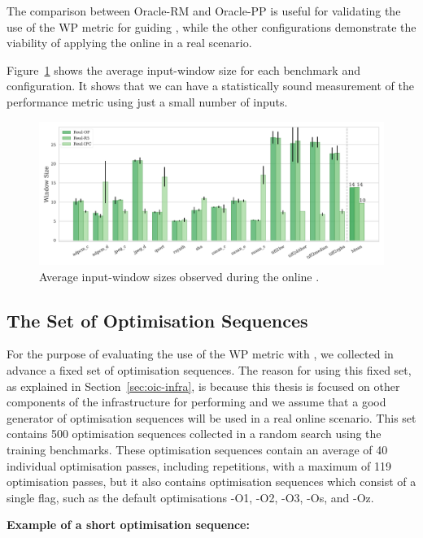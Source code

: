 The comparison between Oracle-RM and Oracle-PP is useful for validating the use of the WP metric for guiding {\itercomp}, while the other configurations demonstrate the viability of applying the online {\itercomp} in a real scenario.

Figure~\ref{fig:window-size} shows the average input-window size for each benchmark and configuration.
It shows that we can have a statistically sound measurement of the performance metric using just a small number of inputs.

\begin{figure}[htb]
    \centering
    \includegraphics[width=\textwidth]{figs/window-size.pdf}
    \caption{Average input-window sizes observed during the online {\itercomp}.}
    \label{fig:window-size}
\end{figure}
\newpage
\subsection{The Set of Optimisation Sequences}

For the purpose of evaluating the use of the WP metric with {\itercomp}, we collected in advance a fixed set of optimisation sequences.
The reason for using this fixed set, as explained in Section~\ref{sec:oic-infra}, is because this thesis is focused on other components of the infrastructure for performing {\itercomp} and we assume that a good generator of optimisation sequences will be used in a real online scenario.
This set contains 500 optimisation sequences collected in a random search using the training benchmarks.
These optimisation sequences contain an average of 40 individual optimisation passes, including repetitions, with a maximum of 119 optimisation passes, but it also contains optimisation sequences which consist of a single flag, such as the default optimisations {\flagstype -O1}, {\flagstype -O2}, {\flagstype -O3}, {\flagstype -Os}, and {\flagstype -Oz}.

  \begin{minipage}{0.9\textwidth}
     \vspace{1em}
     \singlespace
     \noindent\textbf{Example of a short optimisation sequence:}\vspace{-1ex}
  \end{minipage}

